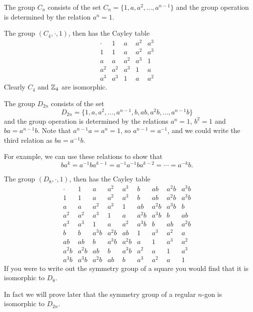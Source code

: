 \begin{example}
  The group $C_{n}$ consists of the set $C_{n} = \{1, a, a^{2}, \ldots, a^{n-1}\}$
  and the group operation is determined by the relation $a^{n} = 1$.
  
  The group $(C_{4}, \cdot, 1)$, then has the Cayley table
  \[
    \begin{array}{c|cccc}
      \cdot &     1 &     a & a^{2} & a^{3} \\
      \hline
          1 &     1 &     a & a^{2} & a^{3} \\
          a &     a & a^{2} & a^{3} &     1 \\
      a^{2} & a^{2} & a^{3} &     1 &     a \\
      a^{3} & a^{3} &     1 &     a & a^{2} 
    \end{array}
  \]
  Clearly $C_{4}$ and $\mathbb{Z}_{4}$ are isomorphic.
\end{example}

\begin{example}
  The group $D_{2n}$ consists of the set
  \[
    D_{2n} = \{1, a, a^{2}, \ldots, a^{n-1}, b, ab, a^{2}b, \ldots, a^{n-1}b \}
  \]
  and the group operation is determined by the relations $a^{n} = 1$,
  $b^{2} = 1$ and $ba = a^{n-1}b$.  Note that $a^{n-1}a = a^{n} = 1$, so
  $a^{n-1} = a^{-1}$, and we could write the third relation as $ba = a^{-1}b$.
  
  For example, we can use these relations to show that
  \[
    ba^{k} = a^{-1}ba^{k-1} = a^{-1}a^{-1}ba^{k-2} = \cdots = a^{-k}b.
  \]
  
  The group $(D_{8}, \cdot, 1)$, then has the Cayley table
  \[
    \begin{array}{c|cccccccc}
      \cdot &      1 &      a &  a^{2} &  a^{3} &      b &     ab & a^{2}b & a^{3}b \\
      \hline
          1 &      1 &      a &  a^{2} &  a^{3} &      b &     ab & a^{2}b & a^{3}b \\
          a &      a &  a^{2} &  a^{3} &      1 &     ab & a^{2}b & a^{3}b &      b \\
      a^{2} &  a^{2} &  a^{3} &      1 &      a & a^{2}b & a^{3}b &      b &     ab \\
      a^{3} &  a^{3} &      1 &      a &  a^{2} & a^{3}b &      b &     ab & a^{2}b \\
          b &      b & a^{3}b & a^{2}b &     ab &      1 &  a^{3} &  a^{2} &      a \\
         ab &     ab &      b & a^{3}b & a^{2}b &      a &      1 &  a^{3} &  a^{2} \\
     a^{2}b & a^{2}b &     ab &      b & a^{3}b &  a^{2} &      a &      1 &  a^{3} \\
     a^{3}b & a^{3}b & a^{2}b &     ab &      b &  a^{3} &  a^{2} &      a &      1
    \end{array}
  \]
  If you were to write out the symmetry group of a square you would find that
  it is isomorphic to $D_{8}$.
  
  In fact we will prove later that the symmetry group of a regular $n$-gon
  is isomorphic to $D_{2n}$.
\end{example}

